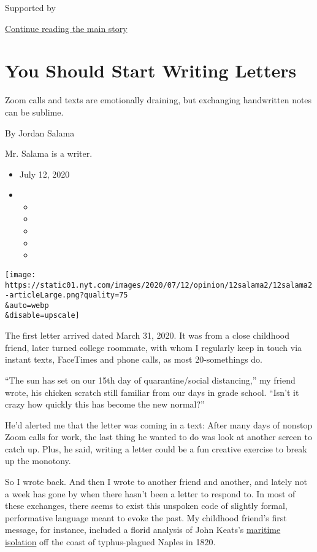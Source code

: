 Supported by

\protect\hyperlink{after-sponsor}{Continue reading the main story}

\hypertarget{you-should-start-writing-letters}{%
\section{You Should Start Writing
Letters}\label{you-should-start-writing-letters}}

Zoom calls and texts are emotionally draining, but exchanging
handwritten notes can be sublime.

By Jordan Salama

Mr. Salama is a writer.

\begin{itemize}
\item
  July 12, 2020
\item
  \begin{itemize}
  \item
  \item
  \item
  \item
  \item
  \end{itemize}
\end{itemize}

\texttt{[image: https://static01.nyt.com/images/2020/07/12/opinion/12salama2/12salama2-articleLarge.png?quality=75\\\&auto=webp\\\&disable=upscale]}

The first letter arrived dated March 31, 2020. It was from a close
childhood friend, later turned college roommate, with whom I regularly
keep in touch via instant texts, FaceTimes and phone calls, as most
20-somethings do.

``The sun has set on our 15th day of quarantine/social distancing,'' my
friend wrote, his chicken scratch still familiar from our days in grade
school. ``Isn't it crazy how quickly this has become the new normal?''

He'd alerted me that the letter was coming in a text: After many days of
nonstop Zoom calls for work, the last thing he wanted to do was look at
another screen to catch up. Plus, he said, writing a letter could be a
fun creative exercise to break up the monotony.

So I wrote back. And then I wrote to another friend and another, and
lately not a week has gone by when there hasn't been a letter to respond
to. In most of these exchanges, there seems to exist this unspoken code
of slightly formal, performative language meant to evoke the past. My
childhood friend's first message, for instance, included a florid
analysis of John Keats's
\href{https://www.nytimes.com/2020/03/26/travel/coronavirus-essay-mayes-keats.html?searchResultPosition=1}{maritime
isolation} off the coast of typhus-plagued Naples in 1820.

